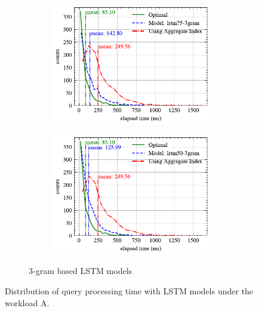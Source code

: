 \documentclass[conference]{IEEEtran}
\begin{document}
\begin{figure}[!th]
\begin{subfigure}{0.45\textwidth}
\begin{subfigure}{\textwidth}
			\includegraphics[]{graphics/perf_dist_lstm75_3gram_A.pdf}
		\end{subfigure}
		\vfill
		\begin{subfigure}{\textwidth}
			\centering
			\includegraphics[]{graphics/perf_dist_lstm50_3gram_A.pdf}
		\end{subfigure}
		\caption{3-gram based LSTM models}
	\end{subfigure}
	\caption{Distribution of query processing time with LSTM models under the workload A.}
	\label{fig:lstm_perf_all_A}
\end{figure}
\end{document}
